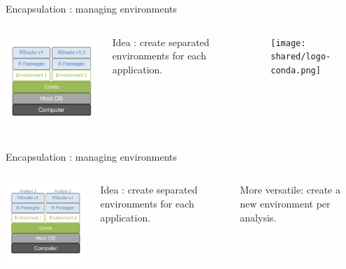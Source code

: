 \begin{frame}{Encapsulation : managing environments}
\begin{columns}

\includegraphics[width=6cm]{02_encapsulation/figures/intro_encapsulation_v2-5.pdf}

Idea : create separated environments for each application.

\texttt{[image: shared/logo-conda.png]}

\end{columns}
\end{frame}

\begin{frame}{Encapsulation : managing environments}
\begin{columns}

\includegraphics[width=6cm]{02_encapsulation/figures/intro_encapsulation_v2-6.pdf}

Idea : create separated environments for each application.

More versatile: create a new environment per analysis.
\end{columns}
\end{frame}


